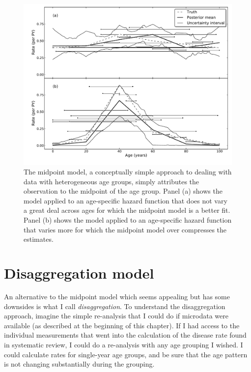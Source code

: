 \begin{figure}[h]
\begin{center}
\includegraphics[width=\textwidth]{age_group_midpoint.pdf}
\caption{The midpoint model, a conceptually simple approach to
  dealing with data with heterogeneous age groups, simply
  attributes the observation to the midpoint of the age group.  Panel
  (a) shows the model applied to an age-specific hazard function that does not
  vary a great deal across ages for which the midpoint model is a
  better fit.  Panel (b) shows the model applied to an age-specific hazard function
  that varies more for which the midpoint model over compresses the
  estimates.}
\label{midpoint}
\end{center}
\end{figure}


\section{Disaggregation model}
An alternative to the midpoint model which seems appealing but has
some downsides is what I call \emph{disaggregation}.  To understand
the disaggregation approach, imagine the simple re-analysis that I
could do if microdata were available (as described at the beginning of
this chapter).  If I had access to the individual measurements that
went into the calculation of the disease rate found in systematic
review, I could do a re-analysis with any age grouping I wished. I
could calculate rates for single-year age groups, and be sure that the
age pattern is not changing substantially during the grouping.

